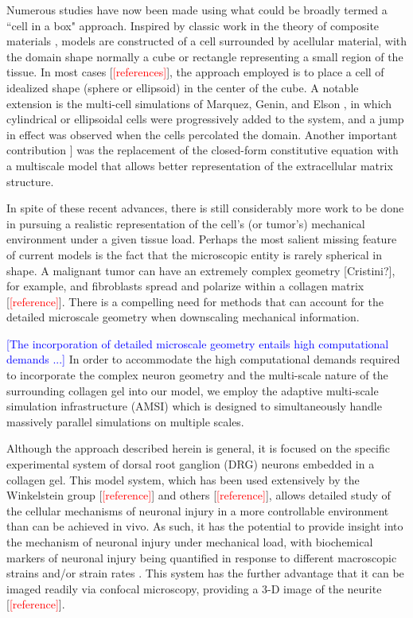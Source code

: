 \documentclass[]{interact}
\newcommand{\blue}[1]{\textcolor{blue}{[#1]}}
\newcommand{\red}[1]{\textcolor{red}{[#1]}}
\begin{document}
Numerous studies have now been made using what could be broadly termed a ``cell in a box" approach. Inspired by classic work in the theory of composite materials \citep{Hashin:1962tm}, models are constructed of a cell surrounded by acellular material, with the domain shape normally a cube or rectangle representing a small region of the tissue.  In most cases [\red{references}], the approach employed is to place a cell of idealized shape (sphere or ellipsoid) in the center of the cube. A notable extension is the multi-cell simulations of Marquez, Genin, and Elson \citep{Marquez:2006gv}, in which cylindrical or ellipsoidal cells were progressively added to the system, and a jump in effect was observed when the cells percolated the domain.  Another important contribution \citep{Lai:2013fp}] was the replacement of the closed-form constitutive equation with a multiscale model that allows better representation of the extracellular matrix structure.

In spite of these recent advances, there is still considerably more work to be done in pursuing a realistic representation of the cell's (or tumor's) mechanical environment under a given tissue load. Perhaps the most salient missing feature of current models is the fact that the microscopic entity is rarely spherical in shape.  A malignant tumor can have an extremely complex geometry [Cristini?], for example, and fibroblasts spread and polarize within a collagen matrix [\red{reference}]. There is a compelling need for methods that can account for the detailed microscale geometry when downscaling mechanical information.

\blue{The incorporation of detailed microscale geometry entails high computational demands ...}
In order to accommodate the high computational demands required to incorporate the complex neuron geometry and the multi-scale nature of the surrounding collagen gel into our model, we employ the adaptive multi-scale simulation infrastructure (AMSI) \citep{Delalondre:2010kt} which is designed to simultaneously handle massively parallel simulations on multiple scales. 

Although the approach described herein is general, it is focused on the specific experimental system of dorsal root ganglion (DRG) neurons embedded in a collagen gel. This model system, which has been used extensively by the Winkelstein group [\red{reference}] and others [\red{reference}], allows detailed study of the cellular mechanisms of neuronal injury in a more controllable environment than can be achieved in vivo. As such, it has the potential to provide insight into the mechanism of neuronal injury under mechanical load, with biochemical markers of neuronal injury being quantified in response to different macroscopic strains and/or strain rates \citep{Zhang:2016ga}. This system has the further advantage that it can be imaged readily via confocal microscopy, providing a 3-D image of the neurite [\red{reference}].
\end{document}
